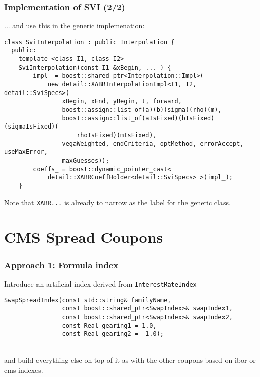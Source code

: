 \documentclass{beamer}
\begin{document}
\begin{frame}[fragile]
\frametitle{Implementation of SVI (2/2)}
... and use this in the generic implemenation:
\begin{verbatim}
class SviInterpolation : public Interpolation {
  public:
    template <class I1, class I2>
    SviInterpolation(const I1 &xBegin, ... ) {
        impl_ = boost::shared_ptr<Interpolation::Impl>(
            new detail::XABRInterpolationImpl<I1, I2, detail::SviSpecs>(
                xBegin, xEnd, yBegin, t, forward,
                boost::assign::list_of(a)(b)(sigma)(rho)(m),
                boost::assign::list_of(aIsFixed)(bIsFixed)(sigmaIsFixed)(
                    rhoIsFixed)(mIsFixed),
                vegaWeighted, endCriteria, optMethod, errorAccept, useMaxError,
                maxGuesses));
        coeffs_ = boost::dynamic_pointer_cast<
            detail::XABRCoeffHolder<detail::SviSpecs> >(impl_);
    }
\end{verbatim}
Note that \verb+XABR...+ is already to narrow as the label for the generic class. 
\end{frame}




\section{CMS Spread Coupons}


\begin{frame}[fragile]
\frametitle{Approach 1: Formula index}
Introduce an artificial index derived from \verb+InterestRateIndex+
\vspace{2mm}
\begin{verbatim}
SwapSpreadIndex(const std::string& familyName,
                const boost::shared_ptr<SwapIndex>& swapIndex1,
                const boost::shared_ptr<SwapIndex>& swapIndex2,
                const Real gearing1 = 1.0,
                const Real gearing2 = -1.0);
\end{verbatim}
\\
\vspace{2mm}
and build everything else on top of it as with the other coupons based
on ibor or cms indexes.
\end{frame}
\end{document}
